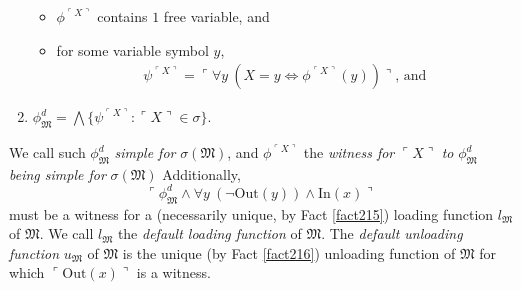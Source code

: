 \documentclass[12pt, twoside]{memoir}
\numberwithin{equation}{section}
\theoremstyle{definition}
\theoremstyle{remark}
\theoremstyle{definition}
\theoremstyle{definition}
\theoremstyle{definition}
\theoremstyle{remark}
\begin{document}
\begin{enumerate}[label=(\alph*)]
\begin{itemize}[label=$\circ$, leftmargin=20pt]
        \item $\phi^{\ulcorner X \urcorner}$ contains $1$ free variable, and
        \item for some variable symbol $y$,
        \begin{align*}
            \psi^{\ulcorner X \urcorner} = \ulcorner \forall y \ (X = y \iff \phi^{\ulcorner X \urcorner}(y)) \urcorner \text{, and}
        \end{align*}
    \end{itemize}
    \item $\phi^d_{\mathfrak{M}} = \bigwedge \{\psi^{\ulcorner X \urcorner} : \ulcorner X \urcorner \in \sigma\}$.
\end{enumerate}
We call such $\phi^d_{\mathfrak{M}}$ \emph{simple for} $\sigma(\mathfrak{M})$, and $\phi^{\ulcorner X \urcorner}$ the \emph{witness for} $\ulcorner X \urcorner$ \emph{to} $\phi^d_{\mathfrak{M}}$ \emph{being simple for} $\sigma(\mathfrak{M})$ Additionally,
\begin{equation*}
    \ulcorner \phi^d_{\mathfrak{M}} \wedge \forall y \ (\neg \mathrm{Out}(y)) \wedge \mathrm{In}(x) \urcorner
\end{equation*}
must be a witness for a (necessarily unique, by Fact \ref{fact215}) loading function $l_{\mathfrak{M}}$ of $\mathfrak{M}$. We call $l_{\mathfrak{M}}$ the \emph{default loading function} of $\mathfrak{M}$. The \emph{default unloading function} $u_{\mathfrak{M}}$ of $\mathfrak{M}$ is the unique (by Fact \ref{fact216}) unloading function of $\mathfrak{M}$ for which $\ulcorner \mathrm{Out}(x) \urcorner$ is a witness.
\end{document}
